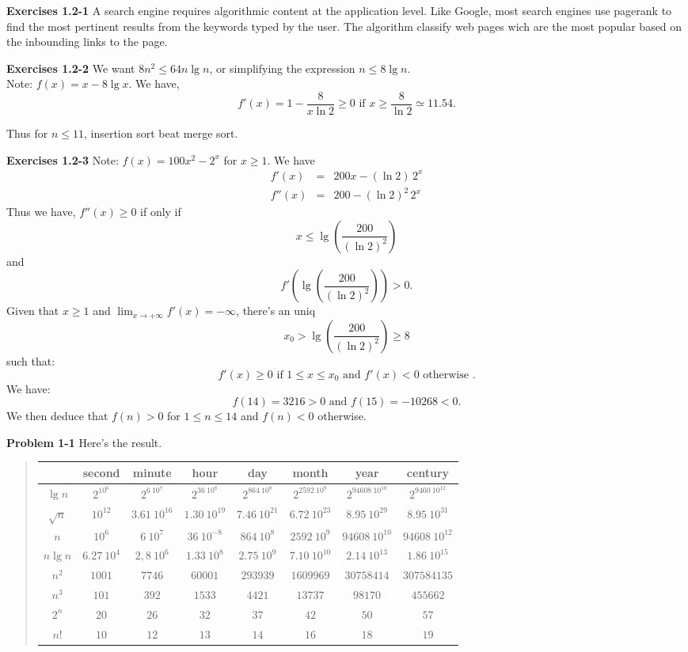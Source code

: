 \documentclass[a4paper,12pt]{article}
\newcommand{\newpar}[1]
{\bigskip \noindent \textbf{Exercises #1} \newline}
\newcommand{\newprob}[1]
{\bigskip \noindent \textbf{Problem #1} \newline}
\begin{document}
\newpar{1.2-1}
A search engine requires algorithmic content at the application
level.  Like Google, most search engines use pagerank to find the most
pertinent results from the keywords typed by the user.  The algorithm
classify web pages wich are the most popular based on the inbounding
links to the page.

\newpar{1.2-2}
 We want $8 n^2 \le 64 n \lg n$, or simplifying the expression $ n \le
 8 \lg n$.\\
Note: $f(x) = x - 8 \lg x$. We have,
\[ f'(x) = 1 - \frac{8}{x \ln 2}\ge 0 \mbox{ if } x \ge 
\frac{8}{\ln 2} \simeq 11.54.\]

Thus for $n \le 11$, insertion sort beat merge sort.

\newpar{1.2-3}
Note: $f(x) = 100 x^2 - 2^x$ for $x \ge 1$.  We have
\begin{eqnarray*}
f'(x) &=& 200 x - (\ln 2)\, 2^x\\
f''(x) &=& 200 - (\ln 2)^2\, 2^x
\end{eqnarray*}
Thus we have, $f''(x) \ge 0$ if only if 
\[x \le \lg \left(\frac{200}{(\ln 2)^2}\right)\]
and
\[f'\left(\lg \left(\frac{200}{(\ln 2)^2}\right)\right) > 0 .\]
Given that $x \ge 1$ and $\lim_{x \to +\infty}f'(x) = -\infty$,
there's an uniq 
\[x_0 > \lg\left(\frac{200}{(\ln 2)^2}\right) \ge 8\]
 such that:
\[ f'(x) \ge 0 \mbox{ if } 1\le x \le x_0 \mbox{ and }f'(x)< 0 
\mbox{ otherwise }.\]
We have:
\[ f(14) = 3216 > 0 \mbox{ and } f(15) = -10268 < 0.\]
We then deduce that $f(n) > 0$ for $1 \le n \le 14$ and $f(n) < 0$
otherwise.

\newprob{1-1} Here's the result.
\begin{quote}
\begin{tabular}{|c|c|c|c|c|c|c|c|}
\hline &second & minute & hour & day & month & year & century\\ \hline
$\lg n$& $2^{10^6}$ & $2^{6\ 10^7}$ & $2^{36\ 10^8}$ & $2^{864\ 10^8}$ & 
$2^{2592\ 10^9}$& $2^{94608\ 10^{10}}$ & $2^{9460\ 10^{12}}$\\ \hline
$\sqrt n$& $10^{12}$ & $3.61\ 10^{16}$ & $1.30\ 10^{19}$ & 
$7.46\ 10^{21}$& $6.72\ 10^{23}$ & $8.95\ 10^{29}$ &
$8.95\ 10^{31}$\\ \hline
$n$ & $10^6$ & $6\ 10^7$ & $36\ 10^{-8}$&$864\ 10^8$ & $2592\ 10^9$ &
$94608\ 10^{10}$ & $94608\ 10^{12}$\\ \hline
$n \lg n$ & $6.27\ 10^{4}$ & $2,8\ 10^6$ & $1.33\ 10^8$ &
$2.75\ 10^9$ & $7.10\ 10^{10}$ & $2.14\ 10^{13}$ &
$1.86\ 10^{15}$\\ \hline
$n^2$ & $1001$ & $7746$ & $60001$ & $293939$ & $1609969$ &
$30758414$ & $307584135$\\ \hline
$n^3$ & $101$ & $392$ & $1533$ & $4421$ & $13737$ & $98170$ &
$455662$\\ \hline
$2^n$ & $20$ & $26$ & $32$ & $37$ & $42$ & $50$ & $57$\\\hline
$n!$ & $10$ & $12$ & $13$ & $14$ & $16$ & $18$ & $19$\\\hline
\end{tabular}
\end{quote}
\end{document}
